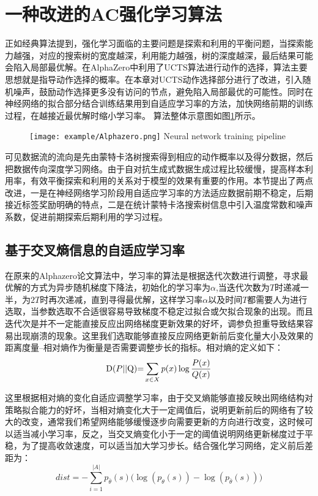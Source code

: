 \section{一种改进的AC强化学习算法}
正如经典算法提到，强化学习面临的主要问题是探索和利用的平衡问题，当探索能力越强，对应的搜索树的宽度越深，利用能力越强，树的深度越深，最后结果可能会陷入局部最优解。在AlphaZero中利用了UCTS算法进行动作的选择，算法主要思想就是指导动作选择的概率。在本章对UCTS动作选择部分进行了改进，引入随机噪声，鼓励动作选择更多没有访问的节点，避免陷入局部最优的可能性。同时在神经网络的拟合部分结合训练结果用到自适应学习率的方法，加快网络前期的训练过程，在越接近最优解时缩小学习率。
算法整体示意图如图\ref{fig:ACgaijin}所示。
\begin{figure}[!htp]
	\centering
	\texttt{[image: example/Alphazero.png]}
	{Neural network training pipeline}
	\label{fig:ACgaijin}
\end{figure}
可见数据流的流向是先由蒙特卡洛树搜索得到相应的动作概率以及得分数据，然后把数据传向深度学习网络。由于自对抗生成式数据生成过程比较缓慢，提高样本利用率，有效平衡探索和利用的关系对于模型的效果有重要的作用。本节提出了两点改进，一是在神经网络学习阶段用自适应学习率的方法适应数据前期不稳定，后期接近标签奖励明确的特点，二是在统计蒙特卡洛搜索树信息中引入温度常数和噪声系数，促进前期探索后期利用的学习过程。
\subsection{基于交叉熵信息的自适应学习率}
在原来的Alphazero论文算法中，学习率的算法是根据迭代次数进行调整，寻求最优解的方式为异步随机梯度下降法，初始化的学习率为$\alpha$,当迭代次数为$T$时递减一半，为$2T$时再次递减，直到寻得最优解，这样学习率$\alpha$以及时间$T$都需要人为进行选取，当参数选取不合适很容易导致梯度不稳定过拟合或欠拟合现象的出现。而且迭代次是并不一定能直接反应出网络梯度更新效果的好坏，调参负担重导致结果容易出现崩溃的现象。这里我们选取能够直接反应网络更新前后变化量大小及效果的距离度量--相对熵作为衡量是否需要调整步长的指标。相对熵的定义如下：
\begin{equation}
{\rm{D}}(P{\rm{||Q}}){\rm{ = }}\sum\limits_{x \in X} {p(x)\log \frac{{P(x)}}{{Q(x)}}} 
\end{equation}

这里根据相对熵的变化自适应调整学习率，由于交叉熵能够直接反映出网络结构对策略拟合能力的好坏，当相对熵变化大于一定阈值后，说明更新前后的网络有了较大的改变，通常我们希望网络能够缓慢逐步向需要更新的方向进行改变，这时候可以适当减小学习率，反之，当交叉熵变化小于一定的阈值说明网络更新梯度过于平稳，为了提高收敛速度，可以适当加大学习步长。结合强化学习网络，定义前后差距为：
\begin{equation}
\label{eq:dist}
dist =  - \sum\limits_{i = 1}^{|A|} {{p_{\bar \theta }}(s)(\log ({p_\theta }(s)) - \log ({p_{\bar \theta }}(s))} )
\end{equation}

